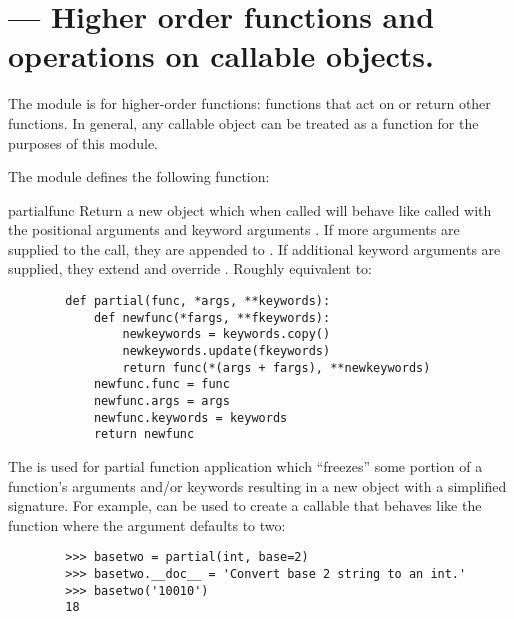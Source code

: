 \section{ ---
         Higher order functions and operations on callable objects.}





The  module is for higher-order functions: functions
that act on or return other functions. In general, any callable object can
be treated as a function for the purposes of this module.


The  module defines the following function:

\begin{funcdesc}{partial}{func}
Return a new  object which when called will behave like
 called with the positional arguments  and keyword
arguments . If more arguments are supplied to the call, they
are appended to . If additional keyword arguments are supplied,
they extend and override . Roughly equivalent to:
  \begin{verbatim}
        def partial(func, *args, **keywords):
            def newfunc(*fargs, **fkeywords):
                newkeywords = keywords.copy()
                newkeywords.update(fkeywords)
                return func(*(args + fargs), **newkeywords)
            newfunc.func = func
            newfunc.args = args
            newfunc.keywords = keywords
            return newfunc
  \end{verbatim}

The  is used for partial function application which
``freezes'' some portion of a function's arguments and/or keywords
resulting in a new object with a simplified signature.  For example,
 can be used to create a callable that behaves like
the  function where the  argument defaults to
two:
  \begin{verbatim}
        >>> basetwo = partial(int, base=2)
        >>> basetwo.__doc__ = 'Convert base 2 string to an int.'
        >>> basetwo('10010')
        18
  \end{verbatim}
\end{funcdesc}

